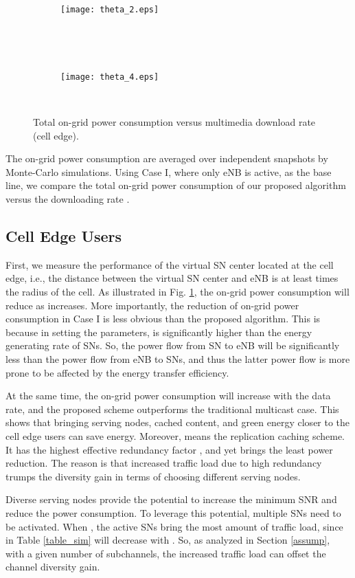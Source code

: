 \documentclass[journal,12pt,onecolumn]{IEEEtran}
\begin{document}
\begin{titlepage}
\begin{center}
\begin{figure}
        \begin{subfigure}[!t]{3 in}
                \texttt{[image: theta\_2.eps]}\caption{}
\end{subfigure}~
        
         ~\begin{subfigure}[!t]{3 in}
                \texttt{[image: theta\_4.eps]}\caption{}
\end{subfigure}
        ~ 

        \caption{Total on-grid power consumption versus multimedia download rate (cell edge).}\label{result}
\end{figure}

The on-grid power consumption are averaged over  independent snapshots by Monte-Carlo simulations. Using Case I, where only eNB is active, as the base line, we compare the total on-grid power consumption of our proposed algorithm versus the downloading rate .
 


\subsection{Cell Edge Users}
First, we measure the performance of the virtual SN center located at the cell edge, i.e., the distance between the virtual SN center and eNB is at least  times the radius of the cell. As illustrated in Fig. \ref{result},  the on-grid power consumption will reduce as  increases. More importantly, the reduction of on-grid power consumption in Case I is less obvious than the proposed algorithm. This is because in setting the parameters,  is significantly higher than the energy generating rate of SNs. So, the power flow from SN to eNB will be significantly less than the power flow from eNB to SNs, and thus the latter power flow is more prone to be affected by the energy transfer efficiency.

At the same time, the on-grid power consumption will increase with the data rate, and the proposed scheme outperforms the traditional multicast case. This shows that bringing serving nodes, cached content, and green energy closer to the cell edge users can save energy. Moreover,  means the replication caching scheme. It has the highest effective redundancy factor , and yet brings the least power reduction. The reason is that increased traffic load due to high redundancy trumps the diversity gain in terms of choosing different serving nodes. 

Diverse serving nodes provide the potential to increase the minimum SNR and reduce the power consumption. To leverage this potential, multiple SNs need to be activated. When , the active SNs bring the most amount of traffic load, since  in Table \ref{table_sim} will decrease with . So, as analyzed in Section \ref{assump}, with a given number of subchannels, the increased traffic load can offset the channel diversity gain. 


\end{center}
\end{titlepage}
\end{document}
